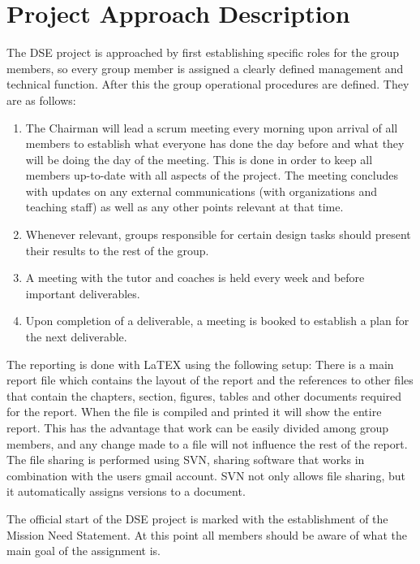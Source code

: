 \section{Project Approach Description}
\label{dseProjectApproachDescription}
The DSE project is approached by first establishing specific roles for the group members, so every group member is assigned a clearly defined management and technical function. After this the group operational procedures are defined. They are as follows:

\begin{enumerate}
	\item The Chairman will lead a scrum meeting every morning upon arrival of all members to establish what everyone has done the day before and what they will be doing the day of the meeting. This is done in order to keep all members up-to-date with all aspects of the project. The meeting concludes with updates on any external communications (with organizations and teaching staff) as well as any other points relevant at that time.
	\item Whenever relevant, groups responsible for certain design tasks should present their results to the rest of the group.
	\item A meeting with the tutor and coaches is held every week and before important deliverables.
	\item Upon completion of a deliverable, a meeting is booked to establish a plan for the next deliverable.  
\end{enumerate}

The reporting is done with LaTEX using the following setup: There is a main report file which contains the layout of the report and the references to other files that contain the chapters, section, figures, tables and other documents required for the report. When the file is compiled and printed it will show the entire report.
This has the advantage that work can be easily divided among group members, and any change made to a file will not influence the rest of the report. The file sharing is performed using SVN, sharing software that works in combination with the users gmail account. SVN not only allows file sharing, but it automatically assigns versions to a document.

The official start of the DSE project is marked with the establishment of the Mission Need Statement. At this point all members should be aware of what the main goal of the assignment is.

